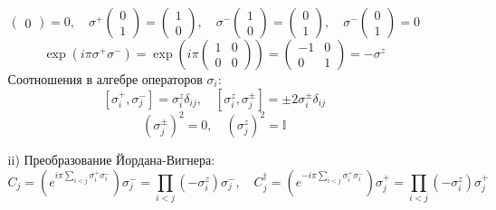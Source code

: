 \documentclass[12pt]{article}
\theoremstyle{definition}
\begin{document}
\begin{enumerate}
\begin{itemize}
\begin{equation}
\begin{pmatrix}
                0
            \end{pmatrix}=0,\quad\sigma^+\begin{pmatrix}
                0\\
                1
            \end{pmatrix}=\begin{pmatrix}
                1\\
                0
            \end{pmatrix},\quad\sigma^-\begin{pmatrix}
                1\\
                0
            \end{pmatrix}=\begin{pmatrix}
                0\\
                1
            \end{pmatrix},\quad\sigma^-\begin{pmatrix}
                0\\
                1
            \end{pmatrix}=0
        \end{equation}
        \begin{equation}
            \exp(i\pi\sigma^+\sigma^-)=\exp\left(i\pi\begin{pmatrix}
                1 & 0\\
                0 & 0
            \end{pmatrix}\right)=\begin{pmatrix}
                -1 & 0\\
                0 & 1
            \end{pmatrix}=-\sigma^z
        \end{equation}
        Соотношения в алгебре операторов $\sigma_i$:
        \begin{equation}
            \boxed{[\sigma_i^+,\sigma_j^-]=\sigma_i^z\delta_{ij},\quad [\sigma_i^z,\sigma_j^\pm]=\pm2\sigma_i^\pm\delta_{ij}}
        \end{equation}
        \begin{equation}
            \boxed{(\sigma_j^\pm)^2=0,\quad(\sigma^z_j)^2=\mathbb{I}}
        \end{equation}
        \item[ii)] Преобразование Йордана-Вигнера:
        \begin{equation}
            C_j=\left(e^{i\pi\sum\limits_{i<j}\sigma^+_i\sigma^-_i}\right)\sigma_j^-=\prod\limits_{i<j}(-\sigma_i^z)\sigma_j^-,\quad C^\dagger_j=\left(e^{-i\pi\sum\limits_{i<j}\sigma^+_i\sigma^-_i}\right)\sigma_j^+=\prod\limits_{i<j}(-\sigma_i^z)\sigma_j^+

\end{equation}
\end{itemize}
\end{enumerate}
\end{document}
